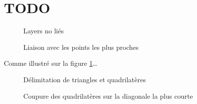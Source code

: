 \documentclass[article, backcover, french, nodocumentinfo]{upmethodology-document}
\newcommand{\TODO}[2][ ]{\todo[inline,color=green]{#2}}
\begin{document}
	\section{TODO}
		\TODO{TODO}
		\par\noindent\begin{minipage}[t]{\textwidth}
			\centering
			\begin{minipage}[t]{0.49\textwidth}
				\begin{figure}[H]
					\centering%
					\caption{Layers no liés}%
					\label{fig:layers_1_empty}%
				\end{figure}
			\end{minipage}
			\begin{minipage}[t]{0.49\textwidth}
				\begin{figure}[H]
					\centering%
					\caption{Liaison avec les points les plus proches}%
					\label{fig:layers_2_nearest_lines}%
				\end{figure}
			\end{minipage}
		\end{minipage}
		\TODO{TODO}
		Comme illustré sur la figure \ref{fig:layers_1_empty}\ldots
		\par\noindent\begin{minipage}[t]{\textwidth}
			\centering
			\begin{minipage}[t]{0.49\textwidth}
				\begin{figure}[H]
					\centering%
					\caption{Délimitation de triangles et quadrilatères}%
					\label{fig:layers_3_triangles_quadrilaterals}%
				\end{figure}
			\end{minipage}
			\begin{minipage}[t]{0.49\textwidth}
				\begin{figure}[H]
					\centering%
					\caption{Coupure des quadrilatères sur la diagonale la plus courte}%
					\label{fig:layers_4_quadrilaterals_diagonals}%
				\end{figure}
			\end{minipage}
		\end{minipage}
		\TODO{TODO}
\end{document}
